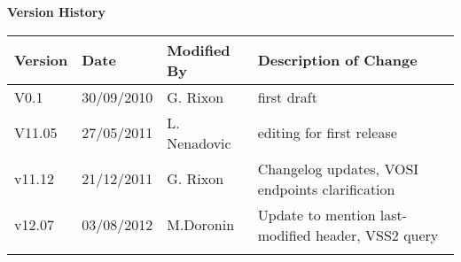 {\begin{titlepage}
\end{titlepage}


\noindent  \large \textbf{Version History} \normalsize

\noindent \begin{tabular}{|l|l|l|l|} 
\hline 
\textbf{Version} & \textbf{Date} & \textbf{Modified By} & \textbf{Description of Change} \\ \hline 
V0.1   & 30/09/2010 & G. Rixon & first draft \\ \hline 
V11.05 & 27/05/2011 & L. Nenadovic & editing for first release \\ \hline 
v11.12 & 21/12/2011 & G. Rixon & Changelog updates, VOSI endpoints clarification \\ \hline 
v12.07 & 03/08/2012 & M.Doronin & Update to mention last-modified header, VSS2 query \\ \hline
 &  &  &  \\ \hline 
\end{tabular}



}